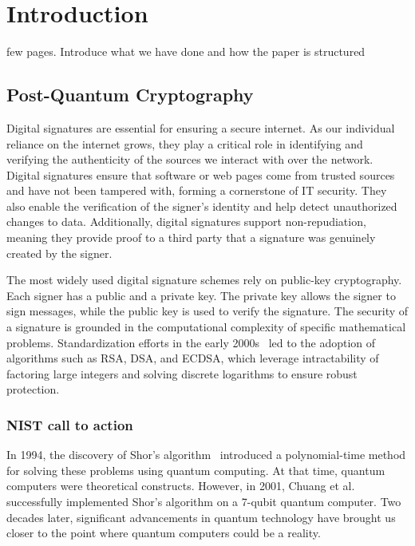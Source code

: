 \documentclass[twoside,11pt]{report}
\theoremstyle{definition}
\theoremstyle{plain}
\begin{document}
\chapter{Introduction}\label{ch:intro}

few pages. Introduce what we have done and how the paper is structured

\section{Post-Quantum Cryptography}\label{sec:quantum}

Digital signatures are essential for ensuring a secure internet. As our individual reliance on the internet grows, they play a critical role in identifying and verifying the authenticity of the sources we interact with over the network. Digital signatures ensure that software or web pages come from trusted sources and have not been tampered with, forming a cornerstone of IT security. They also enable the verification of the signer's identity and help detect unauthorized changes to data. Additionally, digital signatures support non-repudiation, meaning they provide proof to a third party that a signature was genuinely created by the signer.

The most widely used digital signature schemes rely on public-key cryptography. Each signer has a public and a private key. The private key allows the signer to sign messages, while the public key is used to verify the signature. The security of a signature is grounded in the computational complexity of specific mathematical problems. Standardization efforts in the early 2000s~\cite{pub2000digital} led to the adoption of algorithms such as RSA, DSA, and ECDSA, which leverage intractability of factoring large integers and solving discrete logarithms to ensure robust protection.

\subsection{NIST call to action}

In 1994, the discovery of Shor's algorithm~\cite{shor1997} introduced a polynomial-time method for solving these problems using quantum computing. At that time, quantum computers were theoretical constructs. However, in 2001, Chuang et al.~\cite{vandersypen2001experimental,buchmann2004post} successfully implemented Shor's algorithm on a 7-qubit quantum computer. Two decades later, significant advancements in quantum technology have brought us closer to the point where quantum computers could be a reality.
\end{document}
